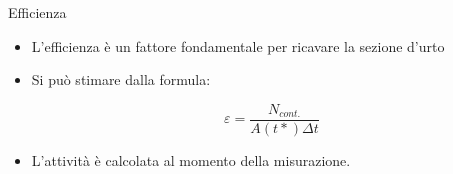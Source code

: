 \documentclass [xcolor=svgnames, 9pt] {beamer}
\begin{document}
\begin{frame}[noframenumbering]{Efficienza}
	\begin{itemize}%
		\item<1-> L'efficienza è un fattore fondamentale per ricavare la sezione d'urto
		\item<2-> Si può stimare dalla formula:
		
		\begin{equation}
			\varepsilon = \dfrac{N_{cont.}}{A(t*) \Delta t}
		\end{equation}
		
		\item<3-> L'attività è calcolata al momento della misurazione. %
		
	\end{itemize}
\end{frame}
\end{document}
